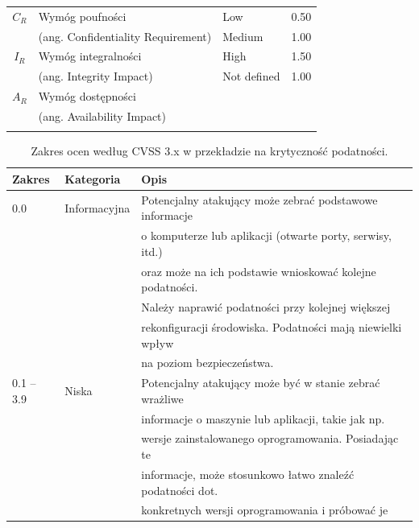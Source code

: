 \begin{table}[tbh]
\begin{center}
\begin{tabular}{cllc}
\hline \noalign {\smallskip}
$C_R$ & Wymóg poufności               & Low	    & 0.50 \\
      & (ang. Confidentiality Requirement) & Medium	& 1.00 \\
$I_R$ & Wymóg integralności           & High	& 1.50 \\
      & (ang. Integrity Impact)            & Not defined	& 1.00\\
$A_R$ & Wymóg dostępności & \\
      & (ang. Availability Impact) & \\ 
\hline \noalign {\smallskip}

\end{tabular}
\end{center}
\end{table}


\begin{table}[tbh]
\caption{Zakres ocen według CVSS 3.x w przekładzie na krytyczność podatności.}
\begin{center}
\label{tab:cvss_criticality_3}
\begin{tabular}{lll}
\hline \noalign {\smallskip}
\textbf{Zakres} & \textbf{Kategoria} & \textbf{Opis} \\
\hline \noalign {\smallskip}
0.0        & Informacyjna & Potencjalny atakujący może zebrać podstawowe informacje    \\
           &              & o komputerze lub aplikacji (otwarte porty, serwisy, itd.)  \\
           &              & oraz może na ich podstawie wnioskować kolejne podatności.  \\
           &              & Należy naprawić podatności przy kolejnej większej          \\
           &              & rekonfiguracji środowiska. Podatności mają niewielki wpływ \\
           &              & na poziom bezpieczeństwa. \\
\hline
0.1 – 3.9  & Niska        & Potencjalny atakujący może być w stanie zebrać wrażliwe    \\
           &              & informacje o maszynie lub aplikacji, takie jak np.         \\
           &              & wersje zainstalowanego oprogramowania. Posiadając te       \\
           &              & informacje, może stosunkowo łatwo znaleźć podatności dot.   \\
           &              & konkretnych wersji oprogramowania i próbować je            \\

\end{tabular}
\end{center}
\end{table}

